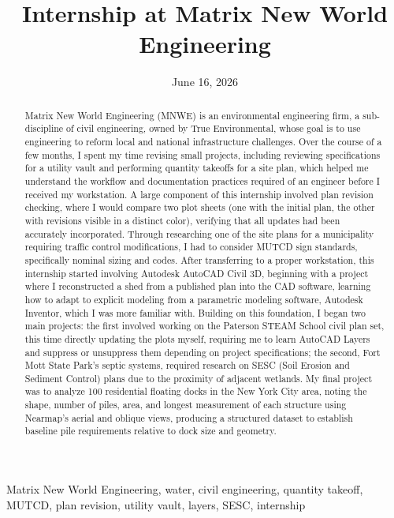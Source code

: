 \documentclass[12pt,conference,onecolumn]{IEEEtran}
\title{Internship at Matrix New World Engineering}
\author{%
\IEEEauthorblockN{Anton Lavrenov}\IEEEauthorblockA{Science \& Engineering\\Manalapan High School\\Englishtown, NJ\\\href{mailto:426alavrenov@frhsd.com}{426alavrenov@frhsd.com}}}
\date{June 16, 2026}
\newcommand{\keywords}{Matrix New World Engineering, water, civil engineering, quantity takeoff, MUTCD, plan revision, utility vault, layers, SESC, internship}
\begin{document}
\maketitle 

\begin{abstract}
Matrix New World Engineering (MNWE) is an environmental engineering firm, a sub-discipline of civil engineering, owned by True Environmental, whose goal is to use engineering to reform local and national infrastructure challenges. Over the course of a few months, I spent my time revising small projects, including reviewing specifications for a utility vault and performing quantity takeoffs for a site plan, which helped me understand the workflow and documentation practices required of an engineer before I received my workstation. A large component of this internship involved plan revision checking, where I would compare two plot sheets (one with the initial plan, the other with revisions visible in a distinct color), verifying that all updates had been accurately incorporated. Through researching one of the site plans for a municipality requiring traffic control modifications, I had to consider MUTCD sign standards, specifically nominal sizing and codes. After transferring to a proper workstation, this internship started involving Autodesk AutoCAD Civil 3D, beginning with a project where I reconstructed a shed from a published plan into the CAD software, learning how to adapt to explicit modeling from a parametric modeling software, Autodesk Inventor, which I was more familiar with. Building on this foundation, I began two main projects: the first involved working on the Paterson STEAM School civil plan set, this time directly updating the plots myself, requiring me to learn AutoCAD Layers and suppress or unsuppress them depending on project specifications; the second, Fort Mott State Park's septic systems, required research on SESC (Soil Erosion and Sediment Control) plans due to the proximity of adjacent wetlands. My final project was to analyze 100 residential floating docks in the New York City area, noting the shape, number of piles, area, and longest measurement of each structure using Nearmap's aerial and oblique views, producing a structured dataset to establish baseline pile requirements relative to dock size and geometry. 
\end{abstract}


\begin{IEEEkeywords}
\keywords
\end{IEEEkeywords}
\end{document}
